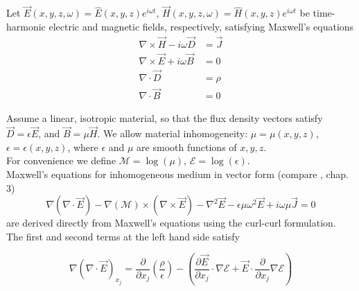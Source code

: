 \documentclass[twocolumn,secnumarabic,amssymb, nobibnotes, aps, prd]{revtex4-1}
\begin{document}
Let $\overrightarrow{E}(x,y,z,\omega) = \hat{E}(x,y,z)e^{i \omega t}$, $\overrightarrow{H}(x,y,z,\omega) = \hat{H}(x,y,z)e^{i \omega t}$ be time-harmonic electric and magnetic fields, respectively, satisfying Maxwell's equations
\begin{subequations}

	\begin{align}
        \nabla \times \overrightarrow{H}-i \omega \overrightarrow{D} &= \overrightarrow{J}  \label{eqns:CurlH_Maxwell}	\\	
        \nabla \times \overrightarrow{E} + i \omega \overrightarrow{B} &= 0  \label{eqns:CurlE_Maxwell} \\
		\nabla \cdot \overrightarrow{D} &=  \rho	 \label{eqns:DivD_Maxwell}\\		
		\nabla \cdot \overrightarrow{B} &= 0	
	\end{align}
\end{subequations}
 
Assume a linear, isotropic material, so that the flux density vectors satisfy $\overrightarrow{D}=\epsilon \overrightarrow{E}$, and $\overrightarrow{B} =\mu \overrightarrow{H}$. We allow material inhomogeneity: $\mu=\mu(x,y,z)$, $\epsilon = \epsilon(x,y,z)$, where $\epsilon$ and $\mu$ are smooth functions of $x,y,z$.\\ 
For convenience we define $\mathcal{M} = \log(\mu)$, $\mathcal{E} = \log(\epsilon)$. \\
Maxwell's equations for inhomogeneous medium in vector form (compare \cite{goodman2005introduction}, chap. 3) 
\begin{equation}
\label{eqns:Generalized_wave_vector}
\nabla (\nabla \cdot \overrightarrow{E})-\nabla(\mathcal{M}) \times \left(\nabla \times \overrightarrow{E} \right) - \nabla^2 \overrightarrow{E} -\epsilon \mu \omega^2 \overrightarrow{E} + i \omega \mu \overrightarrow{J} = 0
\end{equation}
are derived directly from Maxwell's equations using the curl-curl formulation. The first and second terms at the left hand side satisfy

\begin{equation}
\nabla \left( \nabla \cdot \overrightarrow{E} \right)_{x_j} = \frac{\partial}{\partial x_j}\left( \frac{\rho}{\epsilon}\right) - \left(\frac{\partial \overrightarrow{E}}{\partial x_j} \cdot \nabla \mathcal{E} + \overrightarrow{E} \cdot \frac{\partial}{\partial x_j} \nabla \mathcal{E} \right)
\label{eqns:E_Wave_extra_term_Grad_Div_E} 
\end{equation}
\end{document}
